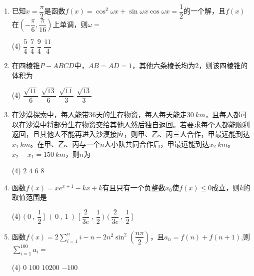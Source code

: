 \documentclass[11pt,a4paper]{ctexart}
\begin{document}
\begin{enumerate}
    \item 已知$x=\dfrac{\pi}{2}$是函数$f(x)= \cos^2 \omega x+ \sin \omega x \cos \omega x=\dfrac{1}{2}$的一个解，且$f(x)$在$(-\dfrac{\pi}{6},\dfrac{\pi}{16})$上单调，则$ \omega =$
    \begin{tasks}(4)
        \task $\dfrac{5}{4}$ 
        \task $\dfrac{7}{4}$
        \task $\dfrac{9}{4}$
        \task $\dfrac{11}{4}$
    \end{tasks}

    \item 在四棱锥$P-ABCD$中，$AB=AD=1$，其他六条棱长均为$2$，则该四棱锥的体积为
    \begin{tasks}(4)
        \task $\dfrac{\sqrt{11}}{6}$ 
        \task $\dfrac{\sqrt{13}}{6}$
        \task $\dfrac{\sqrt{11}}{3}$
        \task $\dfrac{\sqrt{13}}{3}$
    \end{tasks}
    

    \item 在沙漠探索中，每人能带$36$天的生存物资，每人每天能走$30\ km$，且每人都可以在沙漠中将部分生存物资交给其他人然后独自返回。若要求每个人都能顺利返回，且其他人不能再进入沙漠接应，则甲、乙、丙三人合作，甲最远能到达$x_1\ km$。在甲、乙、丙与一个$n$人小队共同合作后，甲最远能到达$x_2\ km$。$x_2-x_1=150\ km$，则$n$为
    \begin{tasks}(4)
        \task $2$
        \task $4$ 
        \task $6$ 
        \task $8$ 
    \end{tasks}

    \item 函数$f(x)=xe^{x+1}-kx+k$有且只有一个负整数$x_0$使$f(x) \le 0$成立，则$k$的取值范围是
    \begin{tasks}(4)
        \task $(\ 0\ ,\ \dfrac{1}{2}\ ]$ 
        \task $(\ 0\ ,\ 1\ )$
        \task $[\ \dfrac{2}{3e}\ ,\ \dfrac{1}{2}\ )$
        \task $(\ \dfrac{2}{3e}\ ,\ \dfrac{1}{2}\ ]$
    \end{tasks}

    \item 函数$f(x)=2\sum_{i=1}^{n} i-n-2n^2 \sin^2 (\dfrac{n \pi}{2})$，且$a_n=f(n)+f(n+1)$,则$\sum_{i=1}^{100} a_i=$
    \begin{tasks}(4)
        \task $0$ 
        \task $100$
        \task $10200$
        \task $-100$
    \end{tasks}
\end{enumerate}
\end{document}
